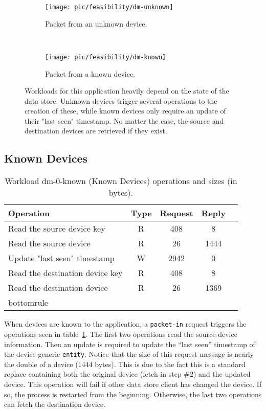 \begin{figure}
  \centering
  \begin{subfigure}[b]{0.5\textwidth}
                \centering
                \texttt{[image: pic/feasibility/dm-unknown]}
                \caption{Packet from an unknown device.}
                \label{fig:dm:interaction:unknown}
        \end{subfigure}%
        ~
        \begin{subfigure}[b]{0.5\textwidth}
                \centering
                \texttt{[image: pic/feasibility/dm-known]}
                \caption{Packet from a known device.}
                \label{fig:dm:interaction:known}
        \end{subfigure}
        \caption[Device Manager workload events]{Workloads for this application heavily depend on the state of the data store. Unknown devices trigger several operations to the creation of these, while known devices only require an update of their "last seen" timestamp. No matter the case, the source and destination devices are retrieved if they exist.}
        \label{fig:dm:interaction}
\end{figure}

\subsection{Known Devices}

\begin{table}[ht]
\small
\centering 
\begin{tabular}{l c c c c}
Operation & Type & Request & Reply \\ \toprule 
Read the source device key & R & 408 & 8\\
Read the source device & R & 26 & 1444\\
Update "last seen" timestamp & W & 2942 & 0\\
Read the destination device key & R & 408 & 8\\
Read the destination device & R & 26 & 1369 \\bottomrule 
\end{tabular}
\caption[Workload dm-0-known (Known Devices) operations]{Workload
  dm-0-known (Known Devices) operations and sizes (in bytes).}
\label{table:ops:dm-0-known}
\end{table}

When devices are known to the application, a \texttt{packet-in} request
triggers the operations seen in table~\ref{table:ops:dm-0-known}. The
first two operations read the source device information. 
Then an update is required to update the ``last seen'' timestamp of the device generic \texttt{entity}. 
Notice that the size of this request message is nearly the double of a device (1444 bytes). 
This is due to the fact this is a standard replace  containing both the original device (fetch in step \#2) and the updated device. 
This operation will fail if other data store client  has changed the device. If so, the process is restarted from the beginning. 
Otherwise, the last two operations can fetch the  destination device. 

